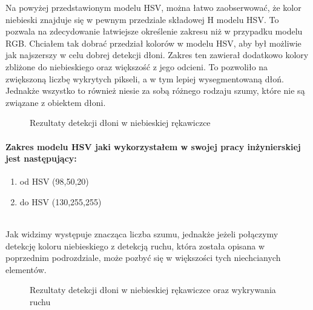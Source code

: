\documentclass[a4paper,12pt,twoside,openany]{report}
\newcommand{\ImgPath}{.}
\begin{document}
Na powyżej przedstawionym modelu HSV, można łatwo zaobserwować, że kolor niebieski znajduje się w pewnym przedziale składowej H modelu HSV. To pozwala na zdecydowanie łatwiejsze określenie zakresu niż w przypadku modelu RGB. 
Chciałem tak dobrać przedział kolorów w modelu HSV, aby był możliwie jak najszerszy w celu dobrej detekcji dłoni. Zakres ten zawierał dodatkowo kolory zbliżone do niebieskiego oraz większość z jego odcieni. To pozwoliło na zwiększoną liczbę wykrytych pikseli, a w tym lepiej wysegmentowaną dłoń. Jednakże wszystko to również niesie za sobą różnego rodzaju szumy, które nie są związane z obiektem dłoni. 
\begin{figure}[H]
	\centering
	\caption{Rezultaty detekcji dłoni w niebieskiej rękawiczce}
\end{figure}

\paragraph{Zakres modelu HSV jaki wykorzystałem w swojej pracy inżynierskiej jest następujący:}
\begin{enumerate}
	\item od HSV (98,50,20)
	\item do HSV (130,255,255)
\end{enumerate}
\mbox{} \\

Jak widzimy występuje znacząca liczba szumu, jednakże jeżeli połączymy detekcję koloru niebieskiego z detekcją ruchu, która została opisana w poprzednim podrozdziale, może pozbyć się w większości tych niechcianych elementów. 

\begin{figure}[H]
	\centering
	\caption{Rezultaty detekcji dłoni w niebieskiej rękawiczce oraz wykrywania ruchu}
\end{figure}
\end{document}
